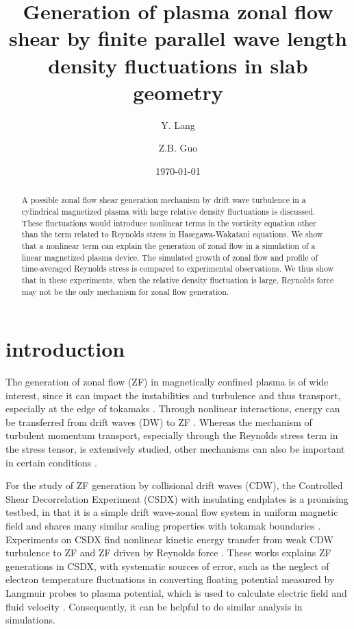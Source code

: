 \documentclass[aps,pre,twocolumn,superscriptaddress]{revtex4-2}
\begin{document}
\title{
Generation of plasma zonal flow shear by finite parallel wave length density fluctuations in slab geometry
}


\author{Y. Lang}
\author{Z.B. Guo}

\date{\today}


\begin{abstract}
A possible zonal flow shear generation mechanism by drift wave turbulence in a cylindrical magnetized plasma with large relative density fluctuations is discussed. These fluctuations would introduce nonlinear terms in the vorticity equation other than the term related to Reynolds stress in Hasegawa-Wakatani equations. We show that a nonlinear term can explain the generation of zonal flow in a simulation of a linear magnetized plasma device. The simulated growth of zonal flow and profile of time-averaged Reynolds stress is compared to experimental observations. We thus show that in these experiments, when the relative density fluctuation is large, Reynolds force may not be the only mechanism for zonal flow generation.
\end{abstract}
\maketitle


\section{\label{sec:introduction}introduction}
The generation of zonal flow (ZF) in magnetically confined plasma is of wide interest, since it can impact the instabilities and turbulence and thus transport, especially at the edge of tokamaks \cite{Li_2020}. Through nonlinear interactions, energy can be transferred from drift waves (DW) to ZF \cite{Diamond_2005}. Whereas the mechanism of turbulent momentum transport, especially through the Reynolds stress term in the stress tensor, is extensively studied, other mechanisms can also be important in certain conditions \cite{Diamond_2009, Diamond_2013}.

For the study of ZF generation by collisional drift waves (CDW), the Controlled Shear Decorrelation Experiment (CSDX) with insulating endplates \cite{Thakur_2013} is a promising testbed, in that it is a simple drift wave-zonal flow system \cite{Xu_2010, Hajjar_2018} in uniform magnetic field and shares many similar scaling properties with tokamak boundaries \cite{Cui_2016}. Experiments on CSDX find nonlinear kinetic energy transfer from weak CDW turbulence to ZF \cite{Xu_2009, Xu_2010} and ZF driven by Reynolds force \cite{Holland_2006,Yan_2008,Yan_2010}. These works explains ZF generations in CSDX, with systematic sources of error, such as the neglect of electron temperature fluctuations in converting floating potential measured by Langmuir probes to plasma potential, which is used to calculate electric field and fluid velocity \cite{Holland_2006,Xu_2009}. Consequently, it can be helpful to do similar analysis in simulations.
\end{document}
